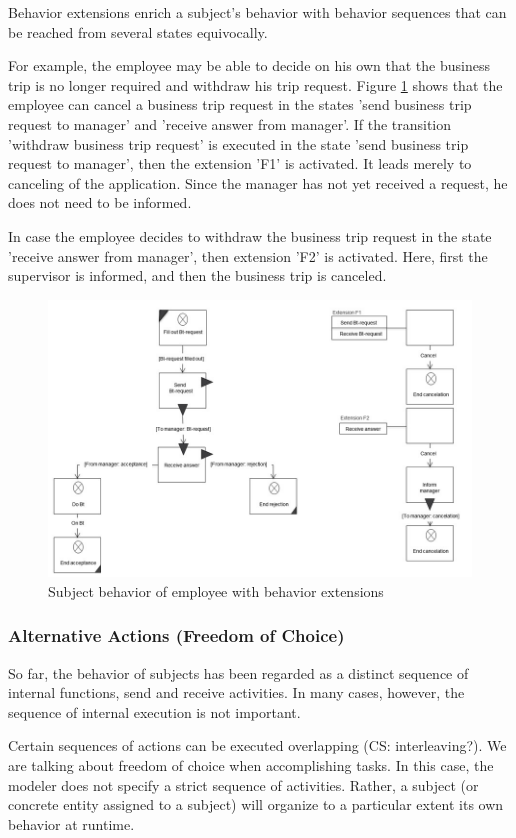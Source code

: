 Behavior extensions enrich a subject's behavior with behavior sequences that can be reached from several states equivocally.

For example, the employee may be able to decide on his own that the business trip is no longer required and withdraw his trip request. Figure \ref{fig:extension} shows that the employee can cancel a business trip request in the states 'send business trip request to manager' and 'receive answer from manager'. If the transition 'withdraw business trip request' is executed in the state 'send business trip request to manager', then the extension 'F1' is activated. It leads merely to canceling of the application. Since the manager has not yet received a request, he does not need to be informed.

In case the employee decides to withdraw the business trip request in the state 'receive answer from manager', then extension 'F2' is activated. Here, first the supervisor is informed, and then the business trip is canceled.

\begin{figure}[htbp]
	\centering
	\includegraphics[width=0.7\linewidth]{Figures/Ontology/SubjectExecution/Extension}
	\caption[Subject behavior of employee with behavior extensions]{Subject behavior of employee with behavior extensions}
	\label{fig:extension}
\end{figure}

\subsubsection{Alternative Actions (Freedom of Choice)} 

So far, the behavior of subjects has been regarded as a distinct sequence of internal functions, send and receive activities. In many cases, however, the sequence of internal execution is not important.

Certain sequences of actions can be executed overlapping (CS: interleaving?). We are talking about freedom of choice when accomplishing tasks. In this case, the modeler does not specify a strict sequence of activities. Rather, a subject (or concrete entity assigned to a subject) will organize to a particular extent its own behavior at runtime.


